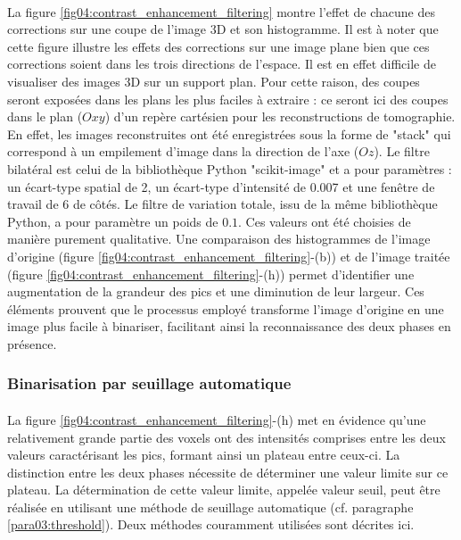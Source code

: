 			\paragraph{}La figure \ref{fig04:contrast_enhancement_filtering} montre l'effet de chacune des corrections sur une coupe de l'image 3D et son histogramme. Il est à noter que cette figure illustre les effets des corrections sur une image plane bien que ces corrections soient dans les trois directions de l'espace. Il est en effet difficile de visualiser des images 3D sur un support plan. Pour cette raison, des coupes seront exposées dans les plans les plus faciles à extraire : ce seront ici des coupes dans le plan ($Oxy$) d'un repère cartésien pour les reconstructions de tomographie. En effet, les images reconstruites ont été enregistrées sous la forme de "stack" qui correspond à un empilement d'image dans la direction de l'axe ($Oz$). Le filtre bilatéral est celui de la bibliothèque Python "scikit-image" \citep{scikit_image} et a pour paramètres : un écart-type spatial de \SI{2}{\voxel}, un écart-type d'intensité de \num{0.007} et une fenêtre de travail de \SI{6}{\voxel} de côtés. Le filtre de variation totale, issu de la même bibliothèque Python, a pour paramètre un poids de $0.1$. Ces valeurs ont été choisies de manière purement qualitative. Une comparaison des histogrammes de l'image d'origine (figure \ref{fig04:contrast_enhancement_filtering}-(b)) et de l'image traitée (figure \ref{fig04:contrast_enhancement_filtering}-(h)) permet d'identifier une augmentation de la grandeur des pics et une diminution de leur largeur. Ces éléments prouvent que le processus employé transforme l'image d'origine en une image plus facile à binariser, facilitant ainsi la reconnaissance des deux phases en présence.
		\subsubsection{Binarisation par seuillage automatique}
			\label{para04:seuillage}
			\paragraph{}La figure \ref{fig04:contrast_enhancement_filtering}-(h) met en évidence qu'une relativement grande partie des voxels ont des intensités comprises entre les deux valeurs caractérisant les pics, formant ainsi un plateau entre ceux-ci. La distinction entre les deux phases nécessite de déterminer une valeur limite sur ce plateau. La détermination de cette valeur limite, appelée valeur seuil, peut être réalisée en utilisant une méthode de seuillage automatique (cf. paragraphe \ref{para03:threshold}). Deux méthodes couramment utilisées sont décrites ici.
